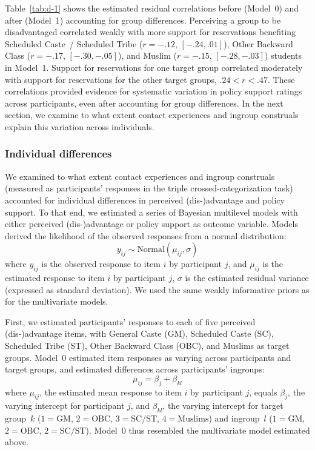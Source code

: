 \documentclass[12pt, a4paper]{article}
\begin{document}
Table~\ref{tab:d-1} shows the estimated residual correlations before (Model~0) and after (Model~1) accounting for group differences. Perceiving a group to be disadvantaged correlated weakly with more support for reservations benefiting Scheduled Caste~/ Scheduled Tribe ($r = -.12 $, $[-.24,.01]$), Other Backward Class ($r = -.17$, $[-.30,-.05]$), and Muslim ($r = -.15$, $[-.28,-.03]$) students in Model~1. Support for reservations for one target group correlated moderately with support for reservations for the other target groups, $.24 < r < .47$. These correlations provided evidence for systematic variation in policy support ratings across participants, even after accounting for group differences. In the next section, we examine to what extent contact experiences and ingroup construals explain this variation across individuals.

\subsubsection{Individual differences}

We examined to what extent contact experiences and ingroup construals (measured as participants' responses in the triple crossed-categorization task) accounted for individual differences in perceived (dis-)advantage and policy support. To that end, we estimated a series of Bayesian multilevel models with either perceived (dis-)advantage or policy support as outcome variable. Models derived the likelihood of the observed responses from a normal distribution: $$ y_{ij} \sim \text{Normal} (\mu_{ij}, \sigma) $$ where $y_{ij}$ is the observed response to item $i$ by participant $j$, and $\mu_{ij}$ is the estimated response to item $i$ by participant $j$, $\sigma$ is the estimated residual variance (expressed as standard deviation). We used the same weakly informative priors as for the multivariate models.

First, we estimated participants' responses to each of five perceived (dis-)advantage items, with General Caste (GM), Scheduled Caste (SC), Scheduled Tribe (ST), Other Backward Class (OBC), and Muslims as target groups. Model~0 estimated item responses as varying across participants and target groups, and estimated differences across participants' ingroups: $$ \mu_{ij} = \beta_{j} + \beta_{kl} $$ where $\mu_{ij}$, the estimated mean response to item $i$ by participant $j$, equals $\beta_j$, the varying intercept for participant $j$, and $\beta_{kl}$, the varying intercept for target group~$k$ ($1 = \text{GM}$, $2 = \text{OBC}$, $3 = \text{SC/ST}$, $4 = \text{Muslims}$) and ingroup~$l$ ($1 = \text{GM}$, $2 = \text{OBC}$, $2 = \text{SC/ST}$). Model~0 thus resembled the multivariate model estimated above. 
\end{document}
